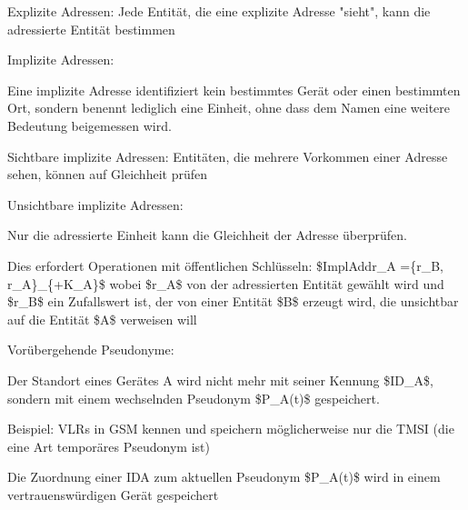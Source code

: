 \documentclass[a4paper]{article}
\begin{document}
\begin{multicols}{3}
\begin{itemize*}
\begin{itemize*}
                  \begin{itemize*}
                        \item Explizite Adressen: Jede Entität, die eine explizite Adresse "sieht", kann die adressierte Entität bestimmen
                  \end{itemize*}
                  \item Implizite Adressen:
                  \begin{itemize*}
                        \item Eine implizite Adresse identifiziert kein bestimmtes Gerät oder einen bestimmten Ort, sondern benennt lediglich eine Einheit, ohne dass dem Namen eine weitere Bedeutung beigemessen wird.
                        \item Sichtbare implizite Adressen: Entitäten, die mehrere Vorkommen einer Adresse sehen, können auf Gleichheit prüfen
                  \end{itemize*}
                  \item Unsichtbare implizite Adressen:
                  \begin{itemize*}
                        \item Nur die adressierte Einheit kann die Gleichheit der Adresse überprüfen.
                        \item Dies erfordert Operationen mit öffentlichen Schlüsseln: \$ImplAddr\_A =\{r\_B, r\_A\}\_\{+K\_A\}\$ wobei \$r\_A\$ von der adressierten Entität gewählt wird und \$r\_B\$ ein Zufallswert ist, der von einer Entität \$B\$ erzeugt wird, die unsichtbar auf die Entität \$A\$ verweisen will
                  \end{itemize*}
            \end{itemize*}
            \item Vorübergehende Pseudonyme:
            \begin{itemize*}
                  \item Der Standort eines Gerätes A wird nicht mehr mit seiner Kennung \$ID\_A\$, sondern mit einem wechselnden Pseudonym \$P\_A(t)\$ gespeichert.
                  \begin{itemize*}
                        \item Beispiel: VLRs in GSM kennen und speichern möglicherweise nur die TMSI (die eine Art temporäres Pseudonym ist)
                  \end{itemize*}
                  \item Die Zuordnung einer IDA zum aktuellen Pseudonym \$P\_A(t)\$ wird in einem vertrauenswürdigen Gerät gespeichert

\end{itemize*}
\end{itemize*}
\end{multicols}
\end{document}
